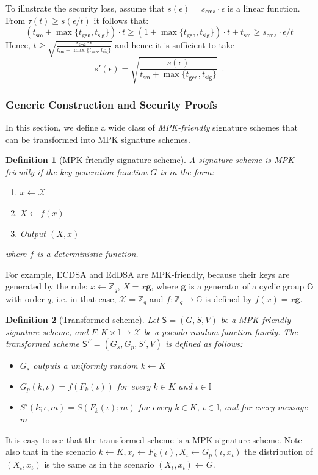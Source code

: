 \documentclass{article}
\newtheorem{definition}{Definition}[section]
\begin{document}
\medskip\medskip
\noindent To illustrate the security loss, assume that $s(\epsilon)=s_\mathsf{cma}\cdot \epsilon$ is a linear function. From $\tau(t)\ge s(\epsilon/t)$ it follows that:
\[
(t_\mathsf{sm}+\max\{t_\mathsf{gen},t_\mathsf{sig}\})\cdot t \ge
(1+\max\{t_\mathsf{gen},t_\mathsf{sig}\})\cdot t + t_\mathsf{sm} \ge s_\mathsf{cma}\cdot \epsilon/t
\]
Hence, $t\ge \sqrt{\frac{s_\mathsf{cma}\cdot \epsilon}{t_\mathsf{sm}+\max\{t_\mathsf{gen},t_\mathsf{sig}\}}}$ and hence it is sufficient to take \[s'(\epsilon)=\sqrt{\frac{s(\epsilon)}{t_\mathsf{sm}+\max\{t_\mathsf{gen},t_\mathsf{sig}\}}}\enspace.
\]

\subsubsection{Generic Construction and Security Proofs}

In this section, we define a wide class of \emph{MPK-friendly} signature schemes that can be transformed into MPK signature schemes.

\begin{definition}[MPK-friendly signature scheme]
A signature scheme is MPK-friendly if the key-generation function $G$ is in the form:
\begin{enumerate}
\item $x\gets \mathcal{X}$
\item $X\gets f(x)$
\item Output $(X,x)$
\end{enumerate}
where $f$ is a deterministic function.
\end{definition}
For example, ECDSA and EdDSA are MPK-friendly, because their keys are generated by the rule: $x\gets \mathbb{Z}_q$, $X=x\mathbf{g}$, where $\mathbf{g}$ is a generator of a cyclic group $\mathbb{G}$ with order $q$, i.e. in that case, $\mathcal{X}=\mathbb{Z}_q$ and $f\colon \mathbb{Z}_q\rightarrow \mathbb{G}$ is defined by  $f(x)=x\mathbf{g}$.


\begin{definition}[Transformed scheme]

Let $\mathsf{S}=(G,S,V)$ be a MPK-friendly signature scheme, and $F\colon K\times \mathbb{I} \rightarrow \mathcal{X}$ be a pseudo-random function family.
The transformed scheme $\mathsf{S}^F=(G_s,G_p,S',V)$ is defined as follows:
\begin{itemize}
\item $G_s$ outputs a uniformly random $k\gets K$
\item $G_p(k,\iota)=f(F_k(\iota))$ for every $k\in K$ and $\iota\in \mathbb{I}$
\item $S'(k;\iota,m)=S(F_k(\iota); m)$ for every $k\in K$, $\iota\in \mathbb{I}$, and for every message $m$
\end{itemize}
\end{definition}
It is easy to see that the transformed scheme is a MPK signature scheme. Note also that in the scenario $k \gets K, x_\iota \gets F_k(\iota), X_\iota\gets G_p(\iota, x_\iota)$
the distribution of $(X_\iota,x_\iota)$ is the same as in the scenario
$(X_\iota,x_\iota)\gets G$.
\end{document}
